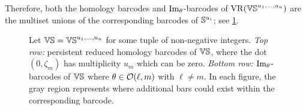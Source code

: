 Therefore, both the homology barcodes and \(\operatorname{Im}_\theta\)-barcodes of \(\mathrm{VR}(\mathbb{VS}^{u_1, \dots, u_n})\) are the multiset unions of the corresponding barcodes of \(\mathbb{S}^{u_i}\); see \cref{fig:barcodes_vs}.

\begin{figure}
	\centering
	
	\caption{Let $\mathbb{VS} = \mathbb{VS}^{u_1,\dots,u_n}$ for some tuple of non-negative integers.
		\emph{Top row:} persistent reduced homology barcodes of $\mathbb{VS}$, where the dot $(0,\zeta_m)$ has multiplicity $u_m$ which can be zero.
		\emph{Bottom row:} $\operatorname{Im}_\theta$-barcodes of $\mathbb{VS}$ where $\theta \in \mathcal{O}(\ell,m)$ with \(\ell \neq m\).
        In each figure, the gray region represents where additional bars could exist within the corresponding barcode.}
	\label{fig:barcodes_vs}
\end{figure}